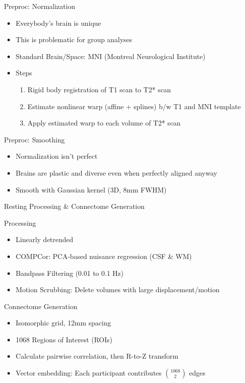 \documentclass[presentation]{beamer}
\begin{document}
\begin{frame}[label={sec:orgheadline12}]{Preproc: Normalization}
\begin{itemize}
\item Everybody's brain is unique
\item This is problematic for group analyses
\item Standard Brain/Space: MNI (Montreal Neurological Institute)
\item Steps
\begin{enumerate}
\item Rigid body registration of T1 scan to T2* scan
\item Estimate nonlinear warp (affine + splines) b/w T1 and MNI template
\item Apply estimated warp to each volume of T2* scan
\end{enumerate}
\end{itemize}
\end{frame}
\begin{frame}[label={sec:orgheadline13}]{Preproc: Smoothing}
\begin{itemize}
\item Normalization isn't perfect
\item Brains are plastic and diverse even when perfectly aligned anyway
\item Smooth with Gaussian kernel (3D, 8mm FWHM)
\end{itemize}
\end{frame}
\begin{frame}[label={sec:orgheadline14}]{Resting Processing \& Connectome Generation}
\begin{block}{Processing}
\begin{itemize}
\item Linearly detrended
\item COMPCor: PCA-based nuisance regression (CSF \& WM)
\item Bandpass Filtering (0.01 to 0.1 Hz)
\item Motion Scrubbing: Delete volumes with large displacement/motion
\end{itemize}
\end{block}
\begin{block}{Connectome Generation}
\begin{itemize}
\item Isomorphic grid, 12mm spacing
\item 1068 Regions of Interest (ROIs)
\item Calculate pairwise correlation, then R-to-Z transform
\item Vector embedding: Each participant contributes \({1068}\choose{2}\) edges
\end{itemize}
\end{block}
\end{frame}
\end{document}
